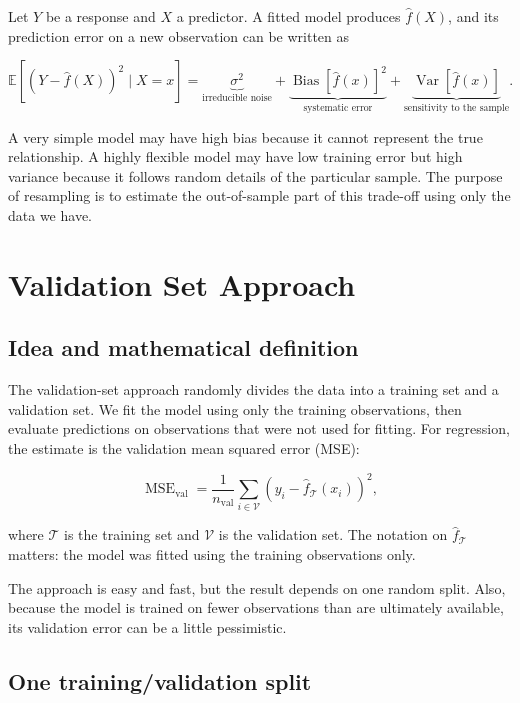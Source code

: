 \documentclass[
  11pt,
]{article}
\begin{document}
Let \(Y\) be a response and \(X\) a predictor. A fitted model produces
\(\hat{f}(X)\), and its prediction error on a new observation can be
written as

\[
\mathbb{E}\left[(Y - \hat{f}(X))^2 \mid X=x\right]
= \underbrace{\sigma^2}_{\text{irreducible noise}}
+ \underbrace{\operatorname{Bias}\left[\hat{f}(x)\right]^2}_{\text{systematic error}}
+ \underbrace{\operatorname{Var}\left[\hat{f}(x)\right]}_{\text{sensitivity to the sample}}.
\]

A very simple model may have high bias because it cannot represent the
true relationship. A highly flexible model may have low training error
but high variance because it follows random details of the particular
sample. The purpose of resampling is to estimate the out-of-sample part
of this trade-off using only the data we have.

\section{Validation Set Approach}\label{validation-set-approach}

\subsection{Idea and mathematical
definition}\label{idea-and-mathematical-definition}

The validation-set approach randomly divides the data into a training
set and a validation set. We fit the model using only the training
observations, then evaluate predictions on observations that were not
used for fitting. For regression, the estimate is the validation mean
squared error (MSE):

\[
\operatorname{MSE}_{\mathrm{val}}
= \frac{1}{n_{\mathrm{val}}}
\sum_{i \in \mathcal{V}}
\left(y_i - \hat{f}_{\mathcal{T}}(x_i)\right)^2,
\]

where \(\mathcal{T}\) is the training set and \(\mathcal{V}\) is the
validation set. The notation on \(\hat{f}_{\mathcal{T}}\) matters: the
model was fitted using the training observations only.

The approach is easy and fast, but the result depends on one random
split. Also, because the model is trained on fewer observations than are
ultimately available, its validation error can be a little pessimistic.

\subsection{One training/validation
split}\label{one-trainingvalidation-split}
\end{document}

